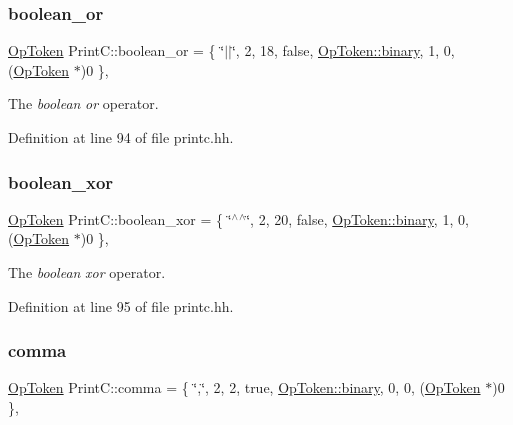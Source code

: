 \subsubsection{\texorpdfstring{boolean\_or}{boolean\_or}}
{\footnotesize\ttfamily \mbox{\hyperlink{class_op_token}{Op\+Token}} Print\+C\+::boolean\+\_\+or = \{ \char`\"{}$\vert$$\vert$\char`\"{}, 2, 18, false, \mbox{\hyperlink{class_op_token_af41c7f108d5662ede7765c5a6c44eaffa3a2ec63522a9329a71ddbe8adc3e752d}{Op\+Token\+::binary}}, 1, 0, (\mbox{\hyperlink{class_op_token}{Op\+Token}} $\ast$)0 \}\hspace{0.3cm}{\ttfamily [static]}, {\ttfamily [protected]}}



The {\itshape boolean} {\itshape or} operator. 



Definition at line 94 of file printc.\+hh.

\mbox{\label{class_print_c_a7793af3839014ca8952d53f153ebe65a}} 
\subsubsection{\texorpdfstring{boolean\_xor}{boolean\_xor}}
{\footnotesize\ttfamily \mbox{\hyperlink{class_op_token}{Op\+Token}} Print\+C\+::boolean\+\_\+xor = \{ \char`\"{}$^\wedge$$^\wedge$\char`\"{}, 2, 20, false, \mbox{\hyperlink{class_op_token_af41c7f108d5662ede7765c5a6c44eaffa3a2ec63522a9329a71ddbe8adc3e752d}{Op\+Token\+::binary}}, 1, 0, (\mbox{\hyperlink{class_op_token}{Op\+Token}} $\ast$)0 \}\hspace{0.3cm}{\ttfamily [static]}, {\ttfamily [protected]}}



The {\itshape boolean} {\itshape xor} operator. 



Definition at line 95 of file printc.\+hh.

\mbox{\label{class_print_c_a1a77d4f930e5b2a7ef0a4e89d5cb6945}} 
\subsubsection{\texorpdfstring{comma}{comma}}
{\footnotesize\ttfamily \mbox{\hyperlink{class_op_token}{Op\+Token}} Print\+C\+::comma = \{ \char`\"{},\char`\"{}, 2, 2, true, \mbox{\hyperlink{class_op_token_af41c7f108d5662ede7765c5a6c44eaffa3a2ec63522a9329a71ddbe8adc3e752d}{Op\+Token\+::binary}}, 0, 0, (\mbox{\hyperlink{class_op_token}{Op\+Token}} $\ast$)0 \}\hspace{0.3cm}{\ttfamily [static]}, {\ttfamily [protected]}}



